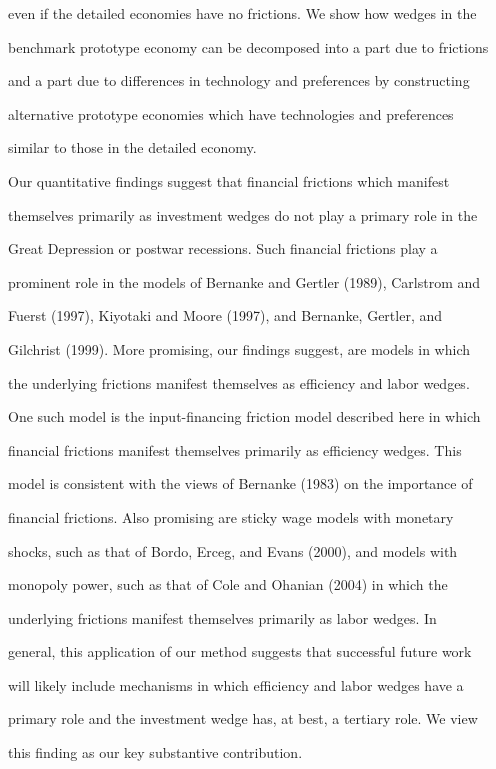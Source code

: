 \documentclass[fleqn,leqno,11pt]{article}
\begin{document}
even if the detailed economies have no frictions. We show how wedges in the

benchmark prototype economy can be decomposed into a part due to frictions

and a part due to differences in technology and preferences by constructing

alternative prototype economies which have technologies and preferences

similar to those in the detailed economy.



Our quantitative findings suggest that financial frictions which manifest

themselves primarily as investment wedges do not play a primary role in the

Great Depression or postwar recessions. Such financial frictions play a

prominent role in the models of Bernanke and Gertler (1989), Carlstrom and

Fuerst (1997), Kiyotaki and Moore (1997), and Bernanke, Gertler, and

Gilchrist (1999). More promising, our findings suggest, are models in which

the underlying frictions manifest themselves as efficiency and labor wedges.

One such model is the input-financing friction model described here in which

financial frictions manifest themselves primarily as efficiency wedges. This

model is consistent with the views of Bernanke (1983) on the importance of

financial frictions. Also promising are sticky wage models with monetary

shocks, such as that of Bordo, Erceg, and Evans (2000), and models with

monopoly power, such as that of Cole and Ohanian (2004) in which the

underlying frictions manifest themselves primarily as labor wedges. In

general, this application of our method suggests that successful future work

will likely include mechanisms in which efficiency and labor wedges have a

primary role and the investment wedge has, at best, a tertiary role. We view

this finding as our key substantive contribution.
\end{document}
